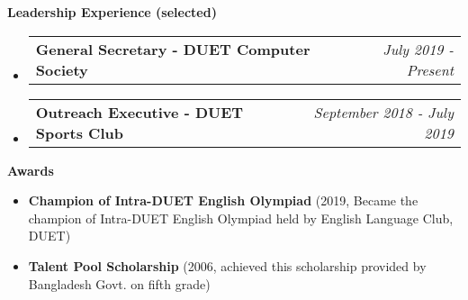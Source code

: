 \documentclass[letterpaper,10pt]{article}
\makeatletter
\newcommand{\resheading}[1]{{\large \colorbox{mygrey}{\begin{minipage}{\textwidth}{\textbf{#1 \vphantom{p\^{E}}}}\end{minipage}}}}
\newcommand{\ressubheading}[4]{
	\begin{tabular*}{7.1in}{l@{\extracolsep{\fill}}r}
		\textbf{#1} & \textit{#4} \\
	\end{tabular*}\vspace{-6pt}}
\makeatother
\begin{document}
	\vspace{0.2in}
	
	\resheading{Leadership Experience (selected)}
	\begin{itemize}
		\item \ressubheading{General Secretary - DUET Computer Society}{}{}{July 2019 - Present}
		\item \ressubheading{Outreach Executive - DUET Sports Club}{}{}{September 2018 - July 2019}
		
	\end{itemize}

	\vspace{0.3in}
	
	\resheading{Awards}
	\begin{itemize}
				
		\item \textbf{Champion of Intra-DUET English Olympiad} (2019, Became the champion of Intra-DUET English Olympiad held by English Language Club, DUET)
	
		\item \textbf{Talent Pool Scholarship} (2006, achieved this scholarship provided by Bangladesh Govt. on fifth grade)

	\end{itemize}

	
	\vspace{0.2in}
	
\end{document}
